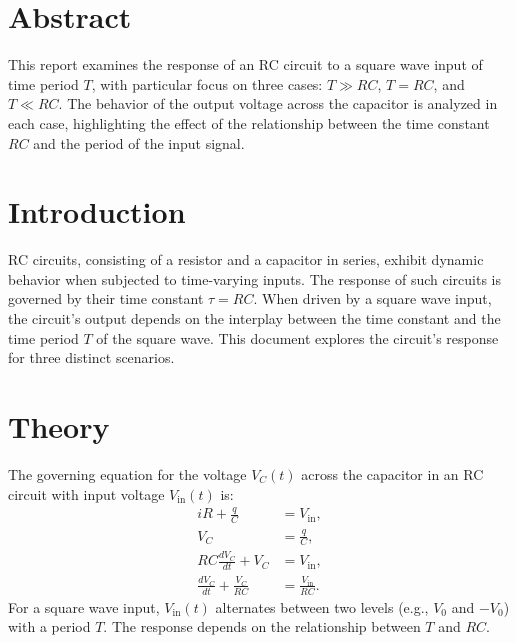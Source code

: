 \documentclass[12pt]{article}
\begin{document}


\vspace{3cm}

\section*{Abstract}
This report examines the response of an RC circuit to a square wave input of time period $T$, with particular focus on three cases: $T \gg RC$, $T = RC$, and $T \ll RC$. The behavior of the output voltage across the capacitor is analyzed in each case, highlighting the effect of the relationship between the time constant $RC$ and the period of the input signal.

\section{Introduction}
RC circuits, consisting of a resistor and a capacitor in series, exhibit dynamic behavior when subjected to time-varying inputs. The response of such circuits is governed by their time constant $\tau = RC$. When driven by a square wave input, the circuit's output depends on the interplay between the time constant and the time period $T$ of the square wave. This document explores the circuit's response for three distinct scenarios.

\section{Theory}
The governing equation for the voltage $V_C(t)$ across the capacitor in an RC circuit with input voltage $V_{\text{in}}(t)$ is:
\begin{align}
    iR + \frac{q}{C} &= V_{\text{in}}, \\
    V_C &= \frac{q}{C}, \\
    RC \frac{dV_C}{dt} + V_C &= V_{\text{in}}, \\
    \frac{dV_C}{dt} + \frac{V_C}{RC} &= \frac{V_{\text{in}}}{RC}.
\end{align}
For a square wave input, $V_{\text{in}}(t)$ alternates between two levels (e.g., $V_0$ and $-V_0$) with a period $T$. The response depends on the relationship between $T$ and $RC$.
\end{document}

